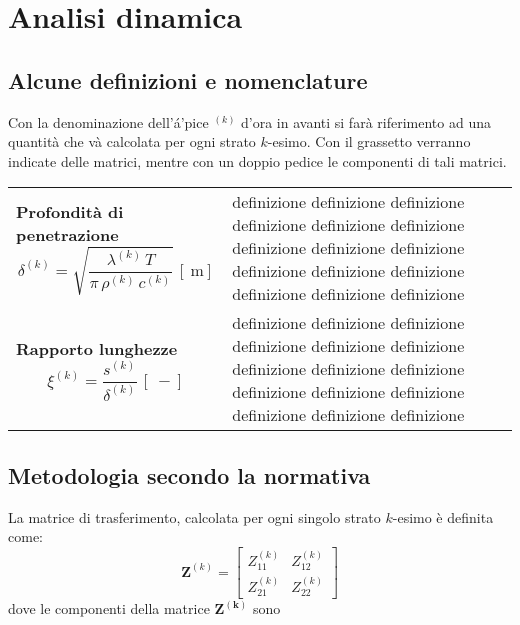 \chapter{Analisi dinamica}
\section*{Alcune definizioni e nomenclature}
Con la denominazione dell'á'pice $^{(k)}$ d'ora in avanti si farà riferimento ad una quantità che và calcolata per ogni strato $k$-esimo. 
Con il  grassetto verranno indicate delle matrici, mentre con un doppio pedice le componenti di tali matrici.
\begin{table}[H]
\centering
\begin{tabular}{p{}p{}}
    \toprule
    \textbf{Profondità di penetrazione}  \[\delta^{(k)} = \sqrt{\frac{\lambda^{(k)} \, T}{\pi \,\rho^{(k)} \,c^{(k)}}} \,\left[\SI{}{\metre}\right]\] & definizione definizione definizione definizione definizione definizione definizione definizione definizione definizione definizione definizione definizione definizione definizione \\
    \textbf{Rapporto lunghezze} \[\xi^{(k)} = \dfrac{s^{(k)}}{\delta^{(k)}} \,\left[\SI{}{-}\right] \] & definizione definizione definizione definizione definizione definizione definizione definizione definizione definizione definizione definizione definizione definizione definizione \\
    \bottomrule
\end{tabular}
\end{table}
\section*{Metodologia secondo la normativa}
La matrice di trasferimento, calcolata per ogni singolo strato $k$-esimo è definita come:
\begin{equation}
    \mathbf{Z}^{(k)} =
    \begin{bmatrix}  
        Z_{11}^{(k)} & Z_{12}^{(k)} \\
        Z_{21}^{(k)} & Z_{22}^{(k)}
    \end{bmatrix}
\end{equation}
dove le componenti della matrice $\mathbf{Z^{(k)}}$ sono

